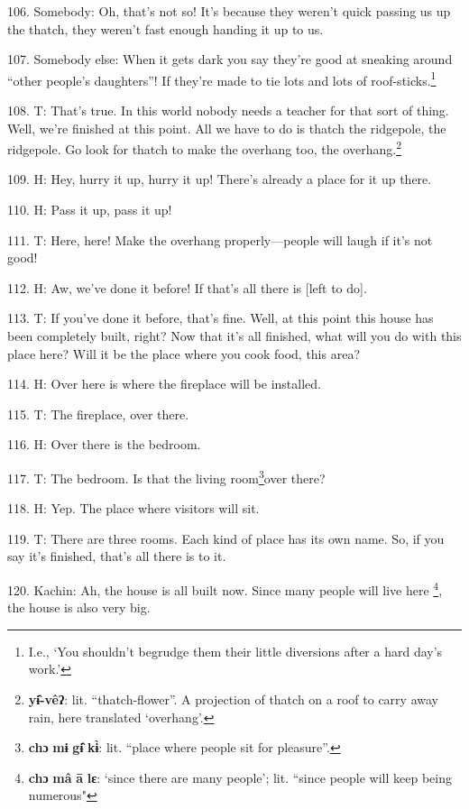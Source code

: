 106. Somebody: Oh, that's not so! It's because they weren't quick passing us up
the thatch, they weren't fast enough handing it up to us.

107. Somebody else: When it gets dark you say they're good at sneaking around ``other
people's daughters''! If they're made to tie lots and lots of roof-sticks.\footnote{I.e., `You shouldn't begrudge them their little diversions after a hard day's work.'}

108. T: That's true. In this world nobody needs a teacher for that sort of thing.
Well, we're finished at this point. All we have to do is thatch the ridgepole,
the ridgepole. Go look for thatch to make the overhang too, the overhang.\footnote{\textbf{yɨ̂-vêʔ}: lit. ``thatch-flower''. A projection of thatch on a roof to carry away rain, here translated `overhang'.}

109. H: Hey, hurry it up, hurry it up! There's already a place for it up there.

110. H: Pass it up, pass it up!

111. T: Here, here! Make the overhang properly---people will laugh if it's not
good!

112. H: Aw, we've done it before! If that's all there is [left to do].

113. T: If you've done it before, that's fine. Well, at this point this house has
been completely built, right? Now that it's all finished, what will you do with
this place here? Will it be the place where you cook food, this area?

114. H: Over here is where the fireplace will be installed.

115. T: The fireplace, over there.

116. H: Over there is the bedroom.

117. T: The bedroom. Is that the living room\footnote{\textbf{chɔ} \textbf{mɨ} \textbf{gɨ̂} \textbf{kɨ̀}: lit. ``place where people sit for pleasure''.}over there?

118. H: Yep. The place where visitors will sit.

119. T: There are three rooms. Each kind of place has its own name. So, if you
say it's finished, that's all there is to it.

120. Kachin: Ah, the house is all built now. Since many people will live here
\footnote{\textbf{chɔ} \textbf{mâ} \textbf{ā} \textbf{lɛ}: `since there are many people'; lit. ``since people will keep being numerous"}, the house is also very big.

